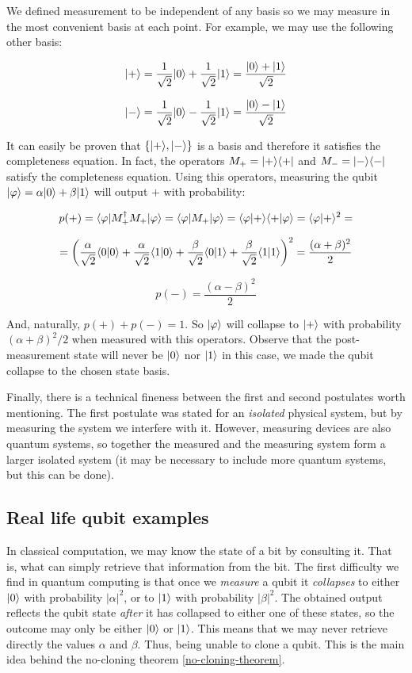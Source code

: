 We defined measurement to be independent of any basis so we may measure in the most convenient basis at each point. For example, we may use the following other basis:

$$ |+\rangle = \frac{1}{\sqrt{2}}|0\rangle + \frac{1}{\sqrt{2}}|1\rangle = \frac{|0\rangle + |1\rangle}{\sqrt{2}} $$

$$ |-\rangle = \frac{1}{\sqrt{2}}|0\rangle - \frac{1}{\sqrt{2}}|1\rangle = \frac{|0\rangle - |1\rangle}{\sqrt{2}} $$

It can easily be proven that $\{|+\rangle, |-\rangle\}$ is a basis and therefore it satisfies the completeness equation. In fact, the operators $M_+ = |+\rangle\langle +|$ and $M_- = |-\rangle\langle -|$ satisfy the completeness equation. Using this operators, measuring the qubit $|\varphi\rangle = \alpha|0\rangle + \beta|1\rangle$ will output $+$ with probability:

$$ p(+) = \langle\varphi|M_+^\dagger M_+|\varphi\rangle = \langle\varphi|M_+|\varphi\rangle = \langle\varphi|+\rangle\langle+|\varphi\rangle = \langle\varphi|+\rangle^2 = $$

$$ = \bigg ( \frac{\alpha}{\sqrt{2}}\langle0|0\rangle + \frac{\alpha}{\sqrt{2}}\langle1|0\rangle + \frac{\beta}{\sqrt{2}}\langle0|1\rangle + \frac{\beta}{\sqrt{2}}\langle1|1\rangle \bigg )^2 = \frac{(\alpha + \beta)^2}{2} $$

$$ p(-) = \frac{(\alpha - \beta)^2}{2} $$

And, naturally, $p(+) + p(-) = 1$. So $|\varphi\rangle$ will collapse to $|+\rangle$ with probability $(\alpha + \beta)^2/2$ when measured with this operators. Observe that the post-measurement state will never be $|0\rangle$ nor $|1\rangle$ in this case, we made the qubit collapse to the chosen state basis.

Finally, there is a technical fineness between the first and second postulates worth mentioning. The first postulate was stated for an \emph{isolated} physical system, but by measuring the system we interfere with it. However, measuring devices are also quantum systems, so together the measured and the measuring system form a larger isolated system (it may be necessary to include more quantum systems, but this can be done).


\subsection{Real life qubit examples}
\label{qubit-examples}


In classical computation, we may know the state of a bit by consulting it. That is, what can simply retrieve that information from the bit. The first difficulty we find in quantum computing is that once we \emph{measure} a qubit it \emph{collapses} to either $|0\rangle$ with probability $|\alpha|^2$, or to $|1\rangle$ with probability $|\beta|^2$. The obtained output reflects the qubit state \emph{after} it has collapsed to either one of these states, so the outcome may only be either $|0\rangle$ or $|1\rangle$. This means that we may never retrieve directly the values $\alpha$ and $\beta$. Thus, being unable to clone a qubit. This is the main idea behind the no-cloning theorem \ref{no-cloning-theorem}.

